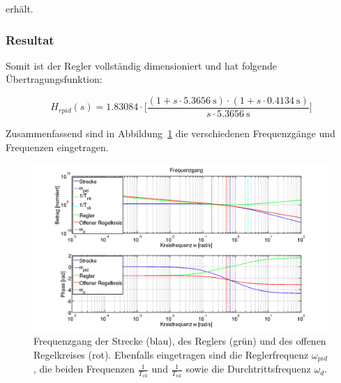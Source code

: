 erh\"alt.


\subsubsection{Resultat}

Somit   ist  der   Regler   vollst\"andig  dimensioniert   und  hat   folgende
\"Ubertragungsfunktion:

\begin{equation} \label{eq:pid:result}
    H_{rpid}(s) = 1.83084 \cdot \biggl[ \frac{(1 + s \cdot \SI{5.3656}{\second} ) \cdot (1 + s \cdot \SI{0.4134}{\second} ) }{ s \cdot \SI{5.3656}{\second} } \biggr]
\end{equation}

Zusammenfassend sind in Abbildung~\ref{fig:pid:complete} die verschiedenen
Frequenzg\"ange und Frequenzen eingetragen.

\begin{figure}[h! width=\pagewidth]
    \includegraphics[width=\textwidth]{images/pidCompletePlot.png}
    \caption{%
        Frequenzgang der Strecke (blau), des  Reglers (gr\"un) und des offenen
        Regelkreises  (rot).  Ebenfalls  eingetragen  sind die  Reglerfrequenz
        $\omega_{pid}$,   die   beiden   Frequenzen   $\frac{1}{T_{vk}}$   und
        $\frac{1}{T_{nk}}$ sowie die Durchtrittsfrequenz $\omega_d$.
    }
    \label{fig:pid:complete}
\end{figure}
